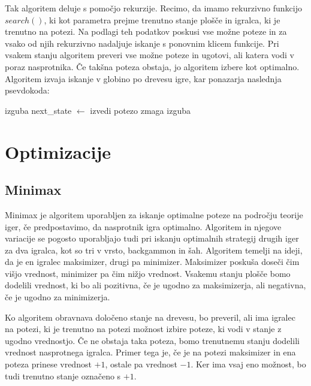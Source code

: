\documentclass[12pt]{report}
\begin{document}
Tak algoritem deluje s pomočjo rekurzije. Recimo, da imamo rekurzivno funkcijo $search()$, ki kot parametra prejme trenutno stanje plošče in igralca, ki je trenutno na potezi. Na podlagi teh podatkov poskusi vse možne poteze in za vsako od njih rekurzivno nadaljuje iskanje s ponovnim klicem funkcije. Pri vsakem stanju algoritem preveri vse možne poteze in ugotovi, ali katera vodi v poraz nasprotnika. Če takšna poteza obstaja, jo algoritem izbere kot optimalno. Algoritem izvaja iskanje v globino po drevesu igre, kar ponazarja naslednja psevdokoda:

\begin{algorithm}[H]
\label{alg:basic_search}
\caption{Psevdokoda osnovnega algoritma}
\begin{algorithmic}[1]
        \State \Return izguba
    \EndIf
        \State next\_state $\gets$ izvedi potezo
            \State \Return zmaga
        \EndIf
    \EndFor
    \State \Return izguba
\EndFunction
\end{algorithmic}
\end{algorithm}

\chapter{Optimizacije}
\section{Minimax}
Minimax je algoritem uporabljen za iskanje optimalne poteze na področju teorije iger, če predpostavimo, da nasprotnik igra optimalno. Algoritem in njegove variacije se pogosto uporabljajo tudi pri iskanju optimalnih strategij drugih iger za dva igralca, kot so tri v vrsto, backgammon in šah. Algoritem temelji na ideji, da je en igralec maksimizer, drugi pa minimizer. Maksimizer poskuša doseči čim višjo vrednost, minimizer pa čim nižjo vrednost. Vsakemu stanju plošče bomo dodelili vrednost, ki bo ali pozitivna, če je ugodno za maksimizerja, ali negativna, če je ugodno za minimizerja. 

Ko algoritem obravnava določeno stanje na drevesu, bo preveril, ali ima igralec na potezi, ki je trenutno na potezi možnost izbire poteze, ki vodi v stanje z ugodno vrednostjo. Če ne obstaja taka poteza, bomo trenutnemu stanju dodelili vrednost nasprotnega igralca. Primer tega je, če je na potezi maksimizer in ena poteza prinese vrednost $+1$, ostale pa vrednost $-1$. Ker ima vsaj eno možnost, bo tudi trenutno stanje označeno s $+1$.
\end{document}
